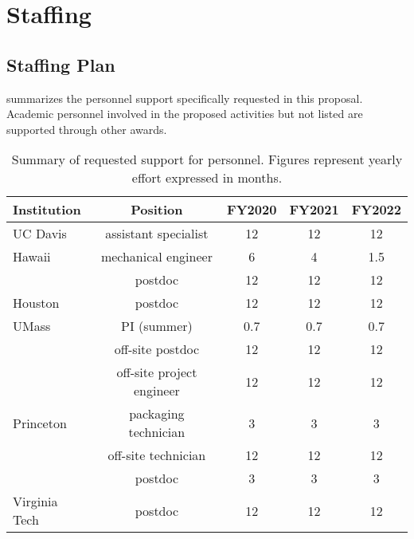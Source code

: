\section{Staffing}



\subsection{Staffing Plan}

 summarizes the personnel support specifically requested in this proposal. Academic personnel involved in the proposed activities but not listed are supported through other awards.

\begin{table}[t!]
\begin{tabular}{lcccc}
\hline \hline
 {\bf Institution}	& {\bf Position}		&{\bf FY2020}	&{\bf FY2021}	&{\bf FY2022}\\
 \hline 
 UC Davis		&assistant specialist 		&12 			&12 			&12\\
 Hawaii 		&mechanical engineer 		&6				&4				&1.5\\
 				&postdoc					&12				&12				&12\\
 Houston 		&postdoc 					&12 			&12 			&12\\
 UMass 			&PI (summer) 				&0.7			&0.7	 		&0.7\\
 				&off-site postdoc 			&12		 		&12 			&12\\
 				&off-site project engineer 	&12 			&12 			&12\\ 
Princeton		&packaging technician 		&3 				&3 				&3\\ 
				&off-site technician 		&12 			&12 			&12\\ 
 				&postdoc					&3				&3				&3\\ 
Virginia Tech 	&postdoc					&12				&12				&12\\
\hline 
\end{tabular}
\caption[Personnel support summary]{Summary of requested support for personnel.  Figures represent yearly effort expressed in months.}
\label{tab:Staffing}
\end{table}


